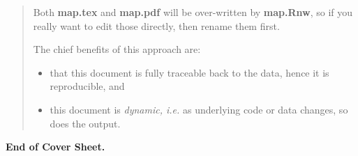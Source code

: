 \documentclass{article}\usepackage[]{graphicx}\usepackage[]{color}
\begin{document}
\begin{flushleft}
\begin{quote}
      Both \textbf{map.tex} and \textbf{map.pdf} will be over-written by \textbf{map.Rnw}, so if
      you really want to edit those directly, then rename them first.
      
      \vspace{12pt}
      
      The chief benefits of this approach are:
      
      \vspace{6pt}
      
      \begin{itemize}
        \item {that this document is fully traceable back to the data, hence it is reproducible,
              and}
        \item {this document is \emph{dynamic, i.e.} as underlying code or data changes, so does   
              the output.}
      \end{itemize}
     \end{quote}
     
     \vspace{24pt}
     
     \textbf{End of Cover Sheet.}


\end{flushleft}
\end{document}
